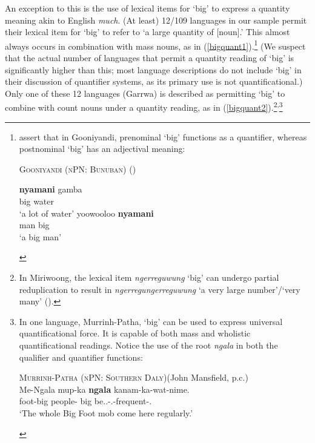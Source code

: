 \documentclass[12pt,egregdoesnotlikesansseriftitles]{scrartcl}
\begin{document}
An exception to this is the use of lexical items for `big' to express a quantity meaning akin to English \textit{much}. (At least) 12/109 languages in our sample permit their lexical item for `big' to refer to `a large quantity of [noun].' This almost always occurs in combination with mass nouns, as in (\ref{bigquant1}).\footnote{\citet[37]{louagieverstraete16} assert that in Gooniyandi, prenominal `big' functions as a quantifier, whereas postnominal `big' has an adjectival meaning:
    \begin{exe}
      \ex  \textsc{Gooniyandi (nPN: Bunuban)} \hfill(\citealt{mcgregor90})
      \vspace{-3mm}
      \begin{xlist}
        \begin{multicols}{2}
          \ex \gll \textbf{nyamani} gamba\\
          big water \\
          \glt `a lot of water'%
          \ex \gll yoowooloo \textbf{nyamani} \\
          man big \\
          \glt `a big man' %
        \end{multicols}
      \end{xlist}
    \end{exe}
} 
(We suspect that the actual number of languages that permit a quantity reading of `big' is significantly higher than this; most language descriptions do not include `big' in their discussion of quantifier systems, as its primary use is not quantificational.) Only one of these 12 languages (Garrwa) is described as permitting `big' to combine with count nouns under a quantity reading, as in (\ref{bigquant2}).\footnote{In Miriwoong, the lexical item \textit{ngerreguwung} `big' can undergo partial reduplication to result in \textit{ngerregungerreguwung} `a very large number'/`very many' (\citealt[43]{kofod78}).}\textsuperscript{,}\footnote{In one language, Murrinh-Patha, `big' can be used to express universal quantificational force. It is capable of both mass and wholistic quantificational readings. Notice the use of the root \textit{ngala} in both the qualifier and quantifier functions:
  \vspace{-2mm}
  \begin{exe}
    \ex \textsc{Murrinh-Patha (nPN: Southern Daly)}\hfill (John Mansfield, p.c.)\\
    \gll Me-Ngala mup-ka \textbf{ngala} kanam-ka-wat-nime.\\
    foot-big people-\Top{} big be.\Tsg.\Nfut-\Pauc.\Sarg-frequent-\Pauc.\M\\
    \glt `The whole Big Foot mob come here regularly.'
  \end{exe}
}
\end{document}
